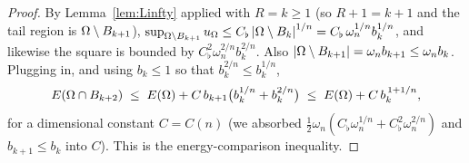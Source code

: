\begin{proof}
By Lemma~\ref{lem:Linfty} applied with $R=k\ge1$ (so $R+1=k+1$ and the
tail region is $\Omega\setminus B_{k+1}$),
$\sup_{\Omega\setminus B_{k+1}}u_\Omega\le C_\flat\left|\Omega\setminus B_k\right|^{1/n}
=C_\flat\,\omega_n^{1/n}b_k^{1/n}$, and likewise the square is bounded by
$C_\flat^2\omega_n^{2/n}b_k^{2/n}$. Also
$\left|\Omega\setminus B_{k+1}\right|=\omega_n b_{k+1}\le\omega_n b_k$. Plugging in,
and using $b_k\le1$ so that $b_k^{2/n}\le b_k^{1/n}$,
\begin{equation}\label{eq:energy-comp}
   E(\Omega\cap B_{k+2})\;\le\;E(\Omega)+C\,b_{k+1}\bigl(b_k^{1/n}+b_k^{2/n}\bigr)
   \;\le\;E(\Omega)+C\,b_k^{\,1+1/n},
\end{equation}
for a dimensional constant $C=C(n)$ (we absorbed
$\tfrac12\omega_n(C_\flat\omega_n^{1/n}+C_\flat^2\omega_n^{2/n})$ and
$b_{k+1}\le b_k$ into $C$). This is the energy-comparison inequality.


\end{proof}
